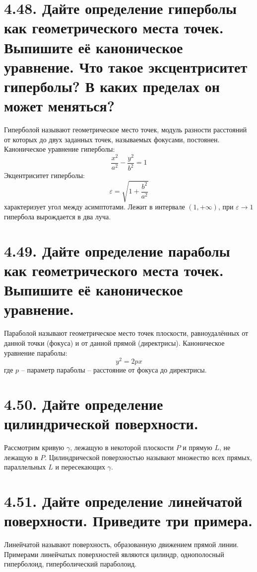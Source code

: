\documentclass{article}
\begin{document}
\section*{\LARGE 4.48. Дайте определение гиперболы как геометрического места точек. Выпишите её каноническое уравнение. Что такое эксцентриситет гиперболы? В каких пределах он может меняться? }
Гиперболой называют геометрическое место точек, модуль разности расстояний от которых до двух заданных точек, называемых фокусами, постоянен.
\newline Каноническое уравнение гиперболы:
$$
\frac{x^2}{a^2} - \frac{y^2}{b^2} = 1
$$
Экцентриситет гиперболы:
$$
\varepsilon = \sqrt{1 + \frac{b^2}{a^2}}
$$
характеризует угол между асимптотами. Лежит в интервале $(1, +\infty)$, при $\varepsilon \rightarrow 1$ гипербола вырождается в два луча.

\section*{\LARGE 4.49. Дайте определение параболы как геометрического места точек. Выпишите её каноническое уравнение.}
Параболой называют геометрическое место точек плоскости, равноудалённых от данной точки (фокуса) и от данной прямой (директрисы).
\newline Каноническое уравнение параболы:
$$
y^2 = 2px
$$
где $p$ -- параметр параболы -- расстояние от фокуса до директрисы.

\section*{\LARGE 4.50. Дайте определение цилиндрической поверхности.}
Рассмотрим кривую $\gamma$, лежащую в некоторой плоскости $P$ и прямую $L$, не лежащую в $P$.
\newline Цилиндрической поверхностью называют множество всех прямых, параллельных $L$ и пересекающих $\gamma$.

\section*{\LARGE 4.51. Дайте определение линейчатой поверхности. Приведите три примера.}
Линейчатой называют поверхность, образованную движением прямой линии. Примерами линейчатых поверхностей являются цилиндр, однополосный гиперболоид, гиперболический параболоид.
\end{document}
